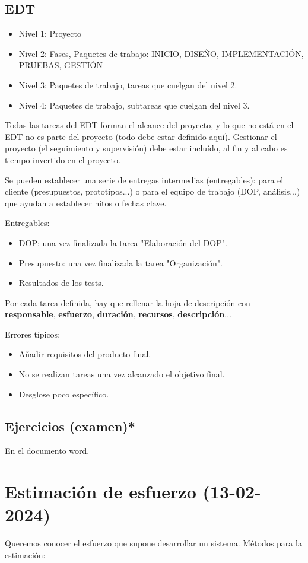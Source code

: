 \documentclass{article}
\begin{document}
\subsection{EDT}
\begin{itemize}
	\item Nivel 1: Proyecto
	\item Nivel 2: Fases, Paquetes de trabajo: INICIO, DISEÑO, IMPLEMENTACIÓN, PRUEBAS, GESTIÓN
	\item Nivel 3: Paquetes de trabajo, tareas que cuelgan del nivel 2.
	\item Nivel 4: Paquetes de trabajo, subtareas que cuelgan del nivel 3.
\end{itemize}
Todas las tareas del EDT forman el alcance del proyecto, y lo que no está en el EDT no es parte del proyecto (todo debe estar definido aquí). 
Gestionar el proyecto (el seguimiento y supervisión) debe estar incluído, al fin y al cabo es tiempo invertido en el proyecto. 

Se pueden establecer una serie de entregas intermedias (entregables): para el cliente (presupuestos, prototipos...) o para el equipo de trabajo (DOP, análisis...) que ayudan a establecer hitos o fechas clave. 

Entregables:
\begin{itemize}
	\item DOP: una vez finalizada la tarea "Elaboración del DOP".
	\item Presupuesto: una vez finalizada la tarea "Organización".
	\item Resultados de los tests.
\end{itemize}

Por cada tarea definida, hay que rellenar la hoja de descripción con \textbf{responsable}, \textbf{esfuerzo}, \textbf{duración}, \textbf{recursos}, \textbf{descripción}...

Errores típicos:
\begin{itemize}
	\item Añadir requisitos del producto final.
	\item No se realizan tareas una vez alcanzado el objetivo final.
	\item Desglose poco específico.
\end{itemize}

\subsection{Ejercicios (examen)*}
En el documento word.
\section{Estimación de esfuerzo (13-02-2024)}
Queremos conocer el esfuerzo que supone desarrollar un sistema. 
Métodos para la estimación:
\end{document}
